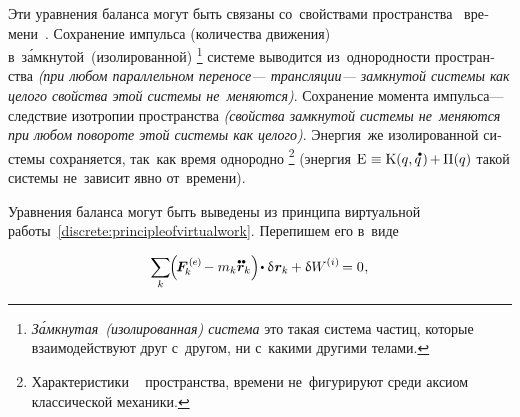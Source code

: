 \begin{otherlanguage}{russian}


Эти уравнения баланса
могут быть связаны
со~свойствами
пространства
~времени~\cite{landau.lifshitz-shortcourse}.
Сохранение импульса
(количества движения)
в~з\'{а}мкнутой~(изолированной)%
\footnote{\emph{З\'{а}мкнутая~(изолированная) система}
это такая система частиц,
которые
взаимодействуют
друг с~другом,
ни с~какими другими телами.}\hspace{-0.25ex}
системе выводится из~однородности пространства \emph{(при любом параллельном переносе\:--- трансляции\:--- замкнутой системы как целого свойства этой системы не~меняются)}.
Сохранение момента импульса\:--- следствие изотропии пространства \emph{(свойства замкнутой системы не~меняются при любом повороте этой системы как целого)}.
Энергия~же
изолированной системы
сохраняется,
так~как
время однородно%
%
\footnote{%
Характеристики
~
пространства,
времени
не~фигурируют среди аксиом
классической механики.
}\hspace{-0.25ex} %
(энергия
${\mathrm{E} \hspace{.1ex} \equiv \kineticenergydensity \hspace{.1ex} (q, \mathdotabove{q} \hspace{.2ex}) \hspace{-0.2ex} + \hspace{-0.1ex} \potentialenergydensity (q)}$
такой системы
не~зависит явно от~времени).

Уравнения баланса могут быть выведены из принципа виртуальной работы~\eqref{discrete:principleofvirtualwork}.
Перепишем его в~виде

\nopagebreak\vspace{-0.2em}\begin{equation}\label{discrete:principleofvirtualwork.externalinternal}
\displaystyle \sum_{\smash{k}} \hspace{-0.2ex} \Bigl( \hspace{-0.25ex} \bm{F}^{\smthexternal}_{\hspace{-0.16ex}k} \hspace{-0.1ex} - m_k \mathdotdotabove{\locationvector}_k \Bigr) \hspace{-0.32ex} \dotp \variation{\hspace{.1ex}\locationvector_k} \hspace{-0.1ex}
+ \variation{\internalwork} \hspace{-0.1ex} = 0 \hspace{.1ex},
\vspace{-0.25em}\end{equation}


\end{otherlanguage}
